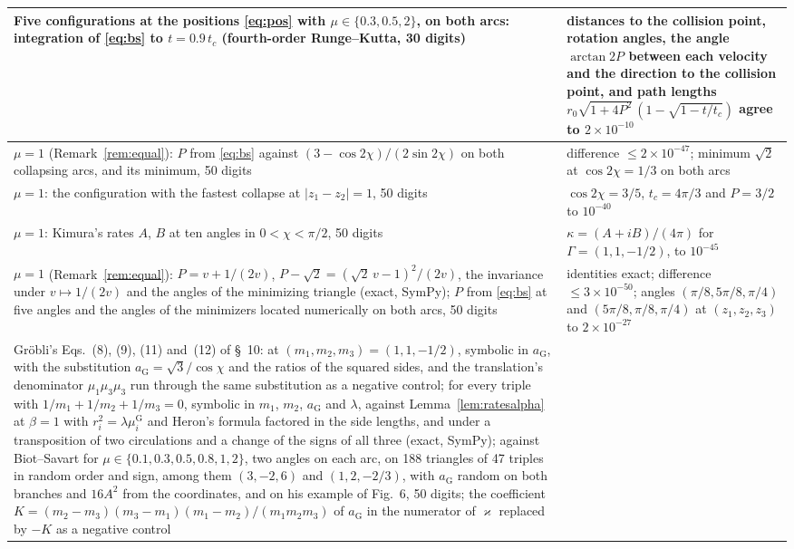 \documentclass[11pt]{article}
\theoremstyle{definition}
\begin{document}
{\begin{longtable}{|>{\raggedright\arraybackslash}p{}|>{\raggedright\arraybackslash}p{}|}
  Five configurations at the positions \eqref{eq:pos} with $\mu \in \{0.3, 0.5, 2\}$, on both arcs: integration of \eqref{eq:bs} to $t = 0.9\, t_c$ (fourth-order Runge--Kutta, 30 digits)
    & distances to the collision point, rotation angles, the angle $\arctan 2P$ between each velocity and the direction to the collision point, and path lengths $r_0 \sqrt{1 + 4P^2}\,(1 - \sqrt{1 - t/t_c})$ agree to $2 \times 10^{-10}$ \\ \hline
  $\mu = 1$ (Remark~\ref{rem:equal}): $P$ from \eqref{eq:bs} against $(3 - \cos 2\chi)/(2\sin 2\chi)$ on both collapsing arcs, and its minimum, 50 digits
    & difference $\le 2 \times 10^{-47}$; minimum $\sqrt{2}$ at $\cos 2\chi = 1/3$ on both arcs \\ \hline
  $\mu = 1$: the configuration with the fastest collapse at $|z_1 - z_2| = 1$, 50 digits
    & $\cos 2\chi = 3/5$, $t_c = 4\pi/3$ and $P = 3/2$ to $10^{-40}$ \\ \hline
  $\mu = 1$: Kimura's rates $A$, $B$ \cite[Eq.~(4.4)]{kimura1987} at ten angles in $0 < \chi < \pi/2$, 50 digits
    & $\kappa = (A + iB)/(4\pi)$ for $\Gamma = (1, 1, -1/2)$, to $10^{-45}$ \\ \hline
  $\mu = 1$ (Remark~\ref{rem:equal}): $P = v + 1/(2v)$, $P - \sqrt{2} = (\sqrt{2}\,v - 1)^2/(2v)$, the invariance under $v \mapsto 1/(2v)$ and the angles of the minimizing triangle (exact, SymPy); $P$ from \eqref{eq:bs} at five angles and the angles of the minimizers located numerically on both arcs, 50 digits
    & identities exact; difference $\le 3 \times 10^{-50}$; angles $(\pi/8, 5\pi/8, \pi/4)$ and $(5\pi/8, \pi/8, \pi/4)$ at $(z_1, z_2, z_3)$ to $2 \times 10^{-27}$ \\ \hline
  Gr\"obli's Eqs.~(8), (9), (11) and~(12) of \S~10: at $(m_1, m_2, m_3) = (1, 1, -1/2)$, symbolic in $a_{\mathrm G}$, with the substitution $a_{\mathrm G} = \sqrt{3}/\cos\chi$ and the ratios of the squared sides, and the translation's denominator $\mu_1\mu_3\mu_3$ run through the same substitution as a negative control; for every triple with $1/m_1 + 1/m_2 + 1/m_3 = 0$, symbolic in $m_1$, $m_2$, $a_{\mathrm G}$ and $\lambda$, against Lemma~\ref{lem:ratesalpha} at $\beta = 1$ with $r_i^2 = \lambda\mu^{\mathrm G}_i$ and Heron's formula factored in the side lengths, and under a transposition of two circulations and a change of the signs of all three (exact, SymPy); against Biot--Savart for $\mu \in \{0.1, 0.3, 0.5, 0.8, 1, 2\}$, two angles on each arc, on 188 triangles of 47 triples in random order and sign, among them $(3, -2, 6)$ and $(1, 2, -2/3)$, with $a_{\mathrm G}$ random on both branches and $16A^2$ from the coordinates, and on his example of Fig.~6, 50 digits; the coefficient $K = (m_2 - m_3)(m_3 - m_1)(m_1 - m_2)/(m_1m_2m_3)$ of $a_{\mathrm G}$ in the numerator of $\varkappa$ replaced by $-K$ as a negative control

\end{longtable}}
\end{document}
